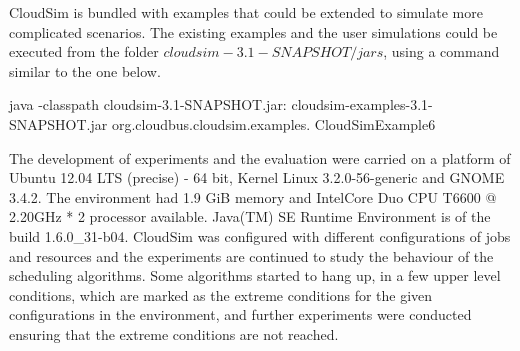 \documentclass[times, 10pt,twocolumn]{article}
\begin{document}
CloudSim is bundled with examples that could be extended to simulate more complicated scenarios. The existing examples and the user simulations could be executed from the folder $cloudsim-3.1-SNAPSHOT/jars$, using a command similar to the one below.
\begin{verbatimtab}
java -classpath
    cloudsim-3.1-SNAPSHOT.jar:
    cloudsim-examples-3.1-SNAPSHOT.jar 
    org.cloudbus.cloudsim.examples.
    CloudSimExample6
\end{verbatimtab}

The development of experiments and the evaluation were carried on a platform of Ubuntu 12.04 LTS (precise) - 64 bit, Kernel Linux 3.2.0-56-generic and GNOME 3.4.2. The environment had 1.9 GiB memory and Intel\textregistered Core Duo CPU T6600 @ 2.20GHz * 2 processor available. Java(TM) SE Runtime Environment is of the build 1.6.0\_31-b04.
CloudSim was configured with different configurations of jobs and resources and the experiments are continued to study the behaviour of the scheduling algorithms. Some algorithms started to hang up, in a few upper level conditions, which are marked as the extreme conditions for the given configurations in the environment, and further experiments were conducted ensuring that the extreme conditions are not reached. 
\end{document}

